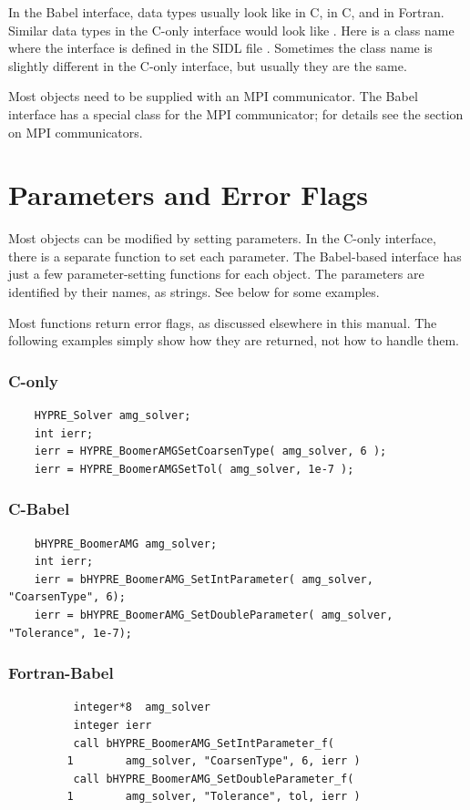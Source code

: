 In the Babel interface, data types usually look like  in
C,  in C, and  in Fortran.  Similar
data types in the C-only interface would look like
.  Here  is a class name where the
interface is defined in the SIDL file .
Sometimes the class name is slightly different in the C-only
interface, but usually they are the same.

Most \hypre{} objects need to be supplied with an MPI communicator.
The Babel interface has a special class for the MPI communicator; for
details see the section on MPI communicators.

\section{Parameters and Error Flags}

Most \hypre{} objects can be modified by setting parameters.  In the
C-only interface, there is a separate function to set each parameter.
The Babel-based interface has just a few parameter-setting functions
for each object.  The parameters are identified by their names, as
strings.  See below for some examples.

Most \hypre{} functions return error flags, as discussed elsewhere in
this manual. The following examples simply show how they are returned,
not how to handle them.

\subsubsection{C-only}
\begin{verbatim}
    HYPRE_Solver amg_solver;
    int ierr;
    ierr = HYPRE_BoomerAMGSetCoarsenType( amg_solver, 6 );
    ierr = HYPRE_BoomerAMGSetTol( amg_solver, 1e-7 );
\end{verbatim}

\subsubsection{C-Babel}
\begin{verbatim}
    bHYPRE_BoomerAMG amg_solver;
    int ierr;
    ierr = bHYPRE_BoomerAMG_SetIntParameter( amg_solver, "CoarsenType", 6);
    ierr = bHYPRE_BoomerAMG_SetDoubleParameter( amg_solver, "Tolerance", 1e-7);
\end{verbatim}

\subsubsection{Fortran-Babel}
\begin{verbatim}
          integer*8  amg_solver
          integer ierr
          call bHYPRE_BoomerAMG_SetIntParameter_f(
         1        amg_solver, "CoarsenType", 6, ierr )
          call bHYPRE_BoomerAMG_SetDoubleParameter_f(
         1        amg_solver, "Tolerance", tol, ierr )
\end{verbatim}

